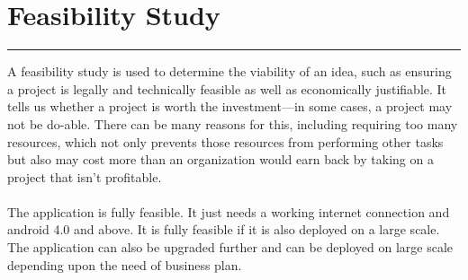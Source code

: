 \chapter{Feasibility Study}\hrule
A feasibility study is used to determine the viability of an idea, such as ensuring a project is legally and technically feasible as well as economically justifiable. It tells us whether a project is worth the investment—in some cases, a project may not be do-able. There can be many reasons for this, including requiring too many resources, which not only prevents those resources from performing other tasks but also may cost more than an organization would earn back by taking on a project that isn’t profitable.\\
\\
The application is fully feasible. It just needs a working internet connection and android 4.0 and above. It is fully feasible if it is also deployed on a large scale.\\
The application can also be upgraded further and can be deployed on large scale depending upon the need of business plan.\\
